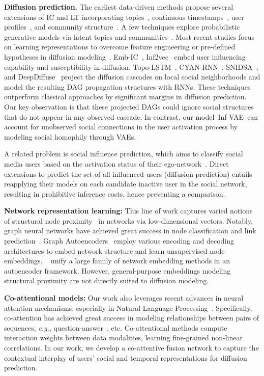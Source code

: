 \documentclass[sigconf]{acmart}
\newcommand{\name}{Inf-VAE}
\begin{document}
\textbf{Diffusion prediction.} 
The earliest data-driven methods propose several extensions of IC and LT incorporating topics~\cite{topic-ic}, continuous timestamps~\cite{ctic}, user profiles~\cite{node_attribute}, and community structure~\cite{cic-icdm}. A few techniques explore probabilistic generative models via latent topics and communities~\citep{cold,hcid}. 
Most recent studies focus on learning representations to overcome feature engineering or pre-defined hypotheses in diffusion modeling~\cite{cdk,aaai15,wsdm16,topolstm,cyanrnn,deepinf,inf2vec,cikm18_attention}.
Emb-IC~\cite{wsdm16}, Inf2vec~\cite{inf2vec} embed user influencing capability and susceptibility in diffusion.
Topo-LSTM~\cite{topolstm}, CYAN-RNN~\cite{cyanrnn}, SNIDSA~\cite{cikm18_attention}, and DeepDiffuse~\cite{deepdiffuse} project the diffusion cascades on local social neighborhoods and model the resulting DAG propagation structures with RNNs.
These techniques outperform classical approaches by significant margins in diffusion prediction. 
Our key observation is that these projected DAGs could ignore social structures that do not appear in any observed cascade. In contrast, our model~\name~can account for unobserved social connections in the user activation process by modeling social homophily through VAEs.

A related problem is social influence prediction, which aims to classify social media users based on the activation status of their ego-network~\cite{locality, deepinf}.
Direct extensions to predict the set of all influenced users (diffusion prediction) entails reapplying their models on each candidate inactive user in the social network, resulting in prohibitive inference costs, hence preventing a comparison. 

\textbf{Network representation learning:}
This line of work captures varied notions of structural node proximity~\cite{node2vec, rase} in networks via low-dimensional vectors.
Notably, graph neural networks have achieved great success
in node classification and link prediction~\cite{gcn,graphsage,gat, motifcnn, metagnn, dysat_arxiv, Narang2019induced}.
Graph Autoencoders~\cite{sdne,vgae} employ various encoding and decoding architectures to embed network structure and learn unsupervised node embeddings.
~\citet{graph_enc_dec} unify a large family of network embedding methods
in an autoencoder framework.
However, general-purpose embeddings modeling structural proximity are not directly suited to diffusion modeling.

 
\textbf{Co-attentional models:}
Our work also leverages recent advances in neural attention mechanisms, especially in Natural Language Processing~\cite{attention}. 
Specifically, co-attention has achieved great success in modeling relationships between pairs of sequences, \textit{e.g.}, question-answer~\cite{dynamic_coattention}, etc.
Co-attentional methods compute interaction weights between data modalities, learning fine-grained non-linear correlations. In our work, we develop a co-attentive fusion network to capture the contextual interplay of users' social and temporal representations for diffusion prediction.
\end{document}
